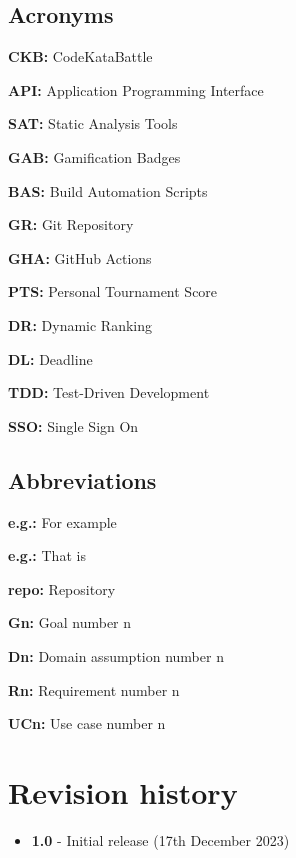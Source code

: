 \subsection{Acronyms}
\begin{description}[labelwidth=4em, style=nextline]
    \item \textbf{CKB:} CodeKataBattle
    \item \textbf{API:} Application Programming Interface
    \item \textbf{SAT:} Static Analysis Tools
    \item \textbf{GAB:} Gamification Badges
    \item \textbf{BAS:} Build Automation Scripts
    \item \textbf{GR:} Git Repository
    \item \textbf{GHA:} GitHub Actions
    \item \textbf{PTS:} Personal Tournament Score
    \item \textbf{DR:} Dynamic Ranking
    \item \textbf{DL:} Deadline
    \item \textbf{TDD:} Test-Driven Development
    \item \textbf{SSO:} Single Sign On
\end{description}

\subsection{Abbreviations}
\begin{description}[labelwidth=4em, style=nextline]
    \item \textbf{e.g.:} For example
    \item \textbf{e.g.:} That is
    \item \textbf{repo:} Repository
    \item \textbf{Gn:} Goal number n
    \item \textbf{Dn:} Domain assumption number n
    \item \textbf{Rn:} Requirement number n
    \item \textbf{UCn:} Use case number n
\end{description}

\section{Revision history}

\begin{itemize}
    \item \textbf{1.0} {-} Initial release (17th December 2023)
\end{itemize}

